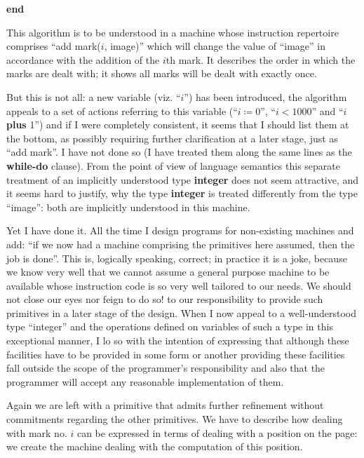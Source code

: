\textbf{end}

\noindent
This algorithm is to be understood in a machine whose instruction repertoire comprises ``add mark($i$, image)'' which will change the value of ``image'' in accordance with the addition of the $i$th mark. It describes the order in which the marks are dealt with; it shows all marks will be dealt with exactly once.

But this is not all: a new variable (viz. ``$i$'') has been introduced, the algorithm appeals to a set of actions referring to this variable (``$i \coloneq 0$'', \mbox{``$i < 1000$''} and ``$i$ \textbf{plus} 1'') and if I were completely consistent, it seems that I should list them at the bottom, as possibly requiring further clarification at a later stage, just as ``add mark''. I have not done so (I have treated them along the same lines as the \textbf{while-do} clause). From the point of view of language semantics this separate treatment of an implicitly understood type \textbf{integer} does not seem attractive, and it seems hard to justify, why the type \textbf{integer} is treated differently from the type ``image'': both are implicitly understood in this machine.

Yet I have done it. All the time I design programs for non-existing machines and add: ``if we now had a machine comprising the primitives here assumed, then the job is done''. This is, logically speaking, correct; in practice it is a joke, because we know very well that we cannot assume a general purpose machine to be available whose instruction code is so very well tailored to our needs. We should not close our eyes \textemdash{}  nor feign to do so! \textemdash{}  to our responsibility to provide such primitives in a later stage of the design. When I now appeal to a well-understood type ``integer'' and the operations defined on variables of such a type in this exceptional manner, I lo so with the intention of expressing that \textemdash{}  although these facilities have to be provided in some form or another \textemdash{}  providing these facilities fall outside the scope of the programmer's responsibility and also that the programmer will accept any reasonable implementation of them.

Again we are left with a primitive that admits further refinement without commitments regarding the other primitives. We have to describe how dealing with mark no. $i$ can be expressed in terms of dealing with a position on the page: we create the machine dealing with the computation of this position.

